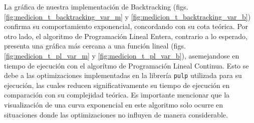La gráfica de nuestra implementación de Backtracking (figs. \ref{fig:medicion_t_backtracking_var_m} y \ref{fig:medicion_t_backtracking_var_b}) confirma su comportamiento exponencial, concordando con su cota teórica. Por otro lado, el algoritmo de Programación Lineal Entera, contrario a lo esperado, presenta una gráfica más cercana a una función lineal (figs. \ref{fig:medicion_t_pl_var_m} y \ref{fig:medicion_t_pl_var_b}), asemejandose en tiempo de ejecución con el algorítmo de Programación Lineal Continua. Esto se debe a las optimizaciones implementadas en la librería \texttt{pulp} utilizada para su ejecución, las cuales reducen significativamente su tiempo de ejecución en comparación con su complejidad teórica. Es importante mencionar que la visualización de una curva exponencial en este algoritmo solo ocurre en situaciones donde las optimizaciones no influyen de manera considerable.

